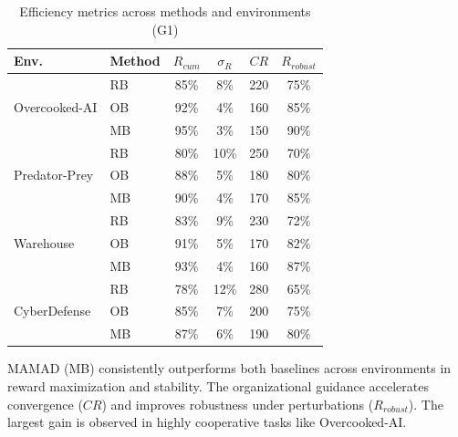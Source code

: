 \documentclass[pdflatex,sn-mathphys-num]{sn-jnl}%
\theoremstyle{thmstyleone}%
\theoremstyle{thmstyletwo}%
\theoremstyle{thmstylethree}%
\begin{document}
\begin{table}[h!]
    \centering
    \caption{Efficiency metrics across methods and environments (G1)}
    \begin{tabular}{l|l|cccc}
        \hline
        \textbf{Env.} & \textbf{Method} & $R_{cum}$ & $\sigma_R$ & $CR$ & $R_{robust}$ \\
        \hline
        \multirow{3}{*}{Overcooked-AI}
                      & RB              & 85\%      & 8\%        & 220  & 75\%         \\
                      & OB              & 92\%      & 4\%        & 160  & 85\%         \\
                      & MB              & 95\%      & 3\%        & 150  & 90\%         \\
        \hline
        \multirow{3}{*}{Predator-Prey}
                      & RB              & 80\%      & 10\%       & 250  & 70\%         \\
                      & OB              & 88\%      & 5\%        & 180  & 80\%         \\
                      & MB              & 90\%      & 4\%        & 170  & 85\%         \\
        \hline
        \multirow{3}{*}{Warehouse}
                      & RB              & 83\%      & 9\%        & 230  & 72\%         \\
                      & OB              & 91\%      & 5\%        & 170  & 82\%         \\
                      & MB              & 93\%      & 4\%        & 160  & 87\%         \\
        \hline
        \multirow{3}{*}{CyberDefense}
                      & RB              & 78\%      & 12\%       & 280  & 65\%         \\
                      & OB              & 85\%      & 7\%        & 200  & 75\%         \\
                      & MB              & 87\%      & 6\%        & 190  & 80\%         \\
        \hline
    \end{tabular}
    \label{tab:g1_efficiency_full}
\end{table}

MAMAD (MB) consistently outperforms both baselines across environments in reward maximization and stability. The organizational guidance accelerates convergence ($CR$) and improves robustness under perturbations ($R_{robust}$). The largest gain is observed in highly cooperative tasks like Overcooked-AI.
\end{document}
